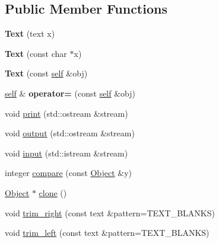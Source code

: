 \subsection*{Public Member Functions}
\begin{DoxyCompactItemize}
\item 
\mbox{\label{classez_1_1objects_1_1Text_af6b66b91eb3b2e748bab5776fa7b10a2}} 
{\bfseries Text} (text x)
\item 
\mbox{\label{classez_1_1objects_1_1Text_abc4554f1b520aaeb090160d3453bf0e5}} 
{\bfseries Text} (const char $\ast$x)
\item 
\mbox{\label{classez_1_1objects_1_1Text_a4c779aa3052e0fa050bce2c63f357b59}} 
{\bfseries Text} (const \hyperlink{classez_1_1objects_1_1Text}{self} \&obj)
\item 
\mbox{\label{classez_1_1objects_1_1Text_a75fc257cd47b72720b32c63d65a5b421}} 
\hyperlink{classez_1_1objects_1_1Text}{self} \& {\bfseries operator=} (const \hyperlink{classez_1_1objects_1_1Text}{self} \&obj)
\item 
void \hyperlink{classez_1_1objects_1_1Text_a3c101a7589871f8fd44117a9f13a159d}{print} (std\+::ostream \&stream)
\item 
void \hyperlink{classez_1_1objects_1_1Text_a7d35b931601e4fb476cd168744bc03d6}{output} (std\+::ostream \&stream)
\item 
void \hyperlink{classez_1_1objects_1_1Text_a4ca781c814cc6c623e4c69ae952c6760}{input} (std\+::istream \&stream)
\item 
integer \hyperlink{classez_1_1objects_1_1Text_a05d5c20a25ced7a9ad33c997f435f226}{compare} (const \hyperlink{classez_1_1objects_1_1Object}{Object} \&y)
\item 
\hyperlink{classez_1_1objects_1_1Object}{Object} $\ast$ \hyperlink{classez_1_1objects_1_1Text_a800bc02ede66fad6e7f95042012a918e}{clone} ()
\item 
void \hyperlink{classez_1_1objects_1_1Text_a77d88f07eb78731a3c743343e821439c}{trim\+\_\+right} (const text \&pattern=T\+E\+X\+T\+\_\+\+B\+L\+A\+N\+KS)
\item 
void \hyperlink{classez_1_1objects_1_1Text_aab110455a9f0c100badb76d30b8888b3}{trim\+\_\+left} (const text \&pattern=T\+E\+X\+T\+\_\+\+B\+L\+A\+N\+KS)
\item 

\end{DoxyCompactItemize}
